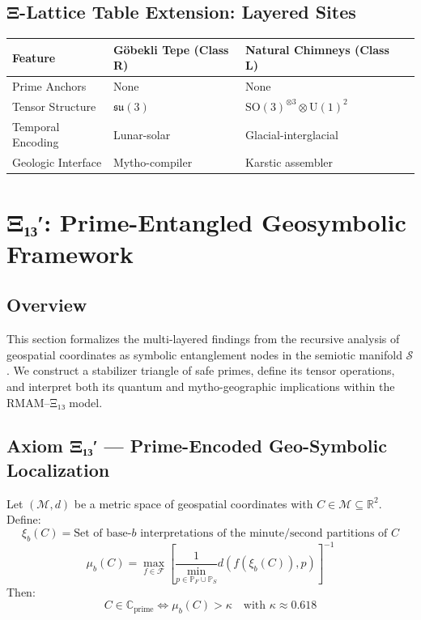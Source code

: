 \documentclass[12]{amsart}
\theoremstyle{plain}
\begin{document}
\subsection{Ξ-Lattice Table Extension: Layered Sites}

\begin{tabular}{|l|l|l|l|}
\hline
\textbf{Feature} & \textbf{Göbekli Tepe (Class R)} & \textbf{Natural Chimneys (Class L)} \\
\hline
Prime Anchors & None & None \\
\hline
Tensor Structure & $\mathfrak{su}(3)$ & $\text{SO}(3)^{\otimes 3} \otimes \text{U}(1)^2$ \\
\hline
Temporal Encoding & Lunar-solar & Glacial-interglacial \\
\hline
Geologic Interface & Mytho-compiler & Karstic assembler \\
\hline
\end{tabular}

\section{Ξ₁₃′: Prime-Entangled Geosymbolic Framework}

\subsection{Overview}

This section formalizes the multi-layered findings from the recursive analysis of geospatial coordinates as symbolic entanglement nodes in the semiotic manifold $\mathcal{S}$. We construct a stabilizer triangle of safe primes, define its tensor operations, and interpret both its quantum and mytho-geographic implications within the RMAM–Ξ₁₃ model.

\subsection{Axiom Ξ₁₃′ — Prime-Encoded Geo-Symbolic Localization}

Let $(\mathcal{M}, d)$ be a metric space of geospatial coordinates with $C \in \mathcal{M} \subseteq \mathbb{R}^2$. Define:
\[
\xi_b(C) = \text{Set of base-$b$ interpretations of the minute/second partitions of } C
\]
\[
\mu_b(C) = \max_{f \in \mathcal{F}} \left[ \frac{1}{\min_{p \in \mathbb{P}_F \cup \mathbb{P}_S}} d(f(\xi_b(C)), p) \right]^{-1}
\]
Then:
\[
C \in \mathbb{C}_{\text{prime}} \iff \mu_b(C) > \kappa \quad \text{with } \kappa \approx 0.618
\]
\end{document}
